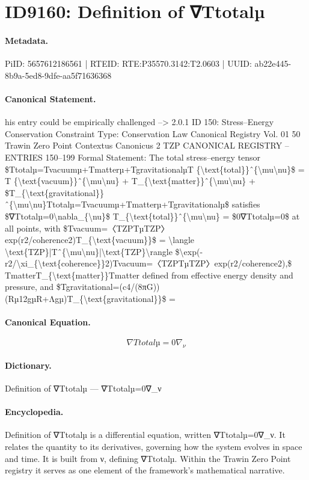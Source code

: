 \section*{ID9160: Definition of ∇Ttotalµ}
\paragraph{Metadata.}
PiID: 5657612186561 | RTEID: RTE:P35570.3142:T2.0603 | UUID: ab22e445-8b9a-5ed8-9dfe-aa5f71636368

\paragraph{Canonical Statement.}
his entry could be empirically challenged --> 2.0.1 ID 150: Stress–Energy Conservation Constraint Type: Conservation Law Canonical Registry Vol. 01 50 Trawin Zero Point Contextus Canonicus 2 TZP CANONICAL REGISTRY – ENTRIES 150–199 Formal Statement: The total stress–energy tensor \$Ttotalµ=Tvacuumµ+Tmatterµ+TgravitationalµT \{\textbackslash{}text\{total\}\}ˆ\{\textbackslash{}mu\textbackslash{}nu\}\$ = T \{\textbackslash{}text\{vacuum\}\}ˆ\{\textbackslash{}mu\textbackslash{}nu\} + T\_\{\textbackslash{}text\{matter\}\}ˆ\{\textbackslash{}mu\textbackslash{}nu\} + \$T\_\{\textbackslash{}text\{gravitational\}\}ˆ\{\textbackslash{}mu\textbackslash{}nu\}Ttotalµ=Tvacuumµ+Tmatterµ+Tgravitationalµ\$ satisfies \$∇Ttotalµ=0\textbackslash{}nabla\_\{\textbackslash{}nu\}\$ T\_\{\textbackslash{}text\{total\}\}ˆ\{\textbackslash{}mu\textbackslash{}nu\} = \$0∇Ttotalµ=0\$ at all points, with \$Tvacuum=〈TZPTµTZP〉exp(r2/coherence2)T\_\{\textbackslash{}text\{vacuum\}\}\$ = \textbackslash{}langle \textbackslash{}text\{TZP\}|Tˆ\{\textbackslash{}mu\textbackslash{}nu\}|\textbackslash{}text\{TZP\}\textbackslash{}rangle \$\textbackslash{}exp(-r2/\textbackslash{}xi\_\{\textbackslash{}text\{coherence\}\}2)Tvacuum=〈TZPTµTZP〉exp(r2/coherence2),\$ TmatterT\_\{\textbackslash{}text\{matter\}\}Tmatter defined from effective energy density and pressure, and \$Tgravitational=(c4/(8πG))(Rµ12gµR+Λgµ)T\_\{\textbackslash{}text\{gravitational\}\}\$ =

\paragraph{Canonical Equation.}
\[
∇Ttotalµ=0\nabla_{\nu}
\]

\paragraph{Dictionary.}
Definition of ∇Ttotalµ — ∇Ttotalµ=0∇\_ν

\paragraph{Encyclopedia.}
Definition of ∇Ttotalµ is a differential equation, written ∇Ttotalµ=0∇\_ν. It relates the quantity to its derivatives, governing how the system evolves in space and time. It is built from ν, defining ∇Ttotalµ. Within the Trawin Zero Point registry it serves as one element of the framework's mathematical narrative.
